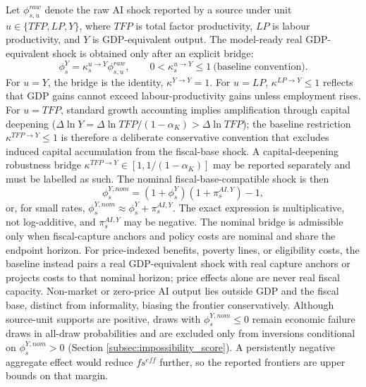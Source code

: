 \documentclass[11pt,a4paper]{article}
\begin{document}
Let $\phi^{raw}_{s,u}$ denote the raw AI shock reported by a source under unit $u\in\{TFP,LP,Y\}$, where $TFP$ is total factor productivity, $LP$ is labour productivity, and $Y$ is GDP-equivalent output. The model-ready real GDP-equivalent shock is obtained only after an explicit bridge:
\begin{equation}
    \phi^Y_s=\kappa^{u\to Y}_s\phi^{raw}_{s,u},\qquad 0<\kappa^{u\to Y}_s\leq 1\ \text{(baseline convention)}.
\end{equation}
For $u=Y$, the bridge is the identity, $\kappa^{Y\to Y}=1$. For $u=LP$, $\kappa^{LP\to Y}\leq1$ reflects that GDP gains cannot exceed labour-productivity gains unless employment rises. For $u=TFP$, standard growth accounting implies amplification through capital deepening ($\Delta\ln Y=\Delta\ln TFP/(1-\alpha_K)>\Delta\ln TFP$); the baseline restriction $\kappa^{TFP\to Y}\leq1$ is therefore a deliberate conservative convention that excludes induced capital accumulation from the fiscal-base shock. A capital-deepening robustness bridge $\kappa^{TFP\to Y}\in[1,1/(1-\alpha_K)]$ may be reported separately and must be labelled as such.
The nominal fiscal-base-compatible shock is then
\begin{equation}
    \phi^{Y,nom}_s=(1+\phi^Y_s)(1+\pi^{AI,Y}_s)-1,
\end{equation}
or, for small rates, $\phi^{Y,nom}_s\approx \phi^Y_s+\pi^{AI,Y}_s$. The exact expression is multiplicative, not log-additive, and $\pi^{AI,Y}_s$ may be negative. The nominal bridge is admissible only when fiscal-capture anchors and policy costs are nominal and share the endpoint horizon. For price-indexed benefits, poverty lines, or eligibility costs, the baseline instead pairs a real GDP-equivalent shock with real capture anchors or projects costs to that nominal horizon; price effects alone are never real fiscal capacity. Non-market or zero-price AI output lies outside GDP and the fiscal base, distinct from informality, biasing the frontier conservatively. Although source-unit supports are positive, draws with $\phi^{Y,nom}_s\leq0$ remain economic failure draws in all-draw probabilities and are excluded only from inversions conditional on $\phi^{Y,nom}_s>0$ (Section \ref{subsec:impossibility_score}). A persistently negative aggregate effect would reduce $fs^{eff}$ further, so the reported frontiers are upper bounds on that margin.
\end{document}
